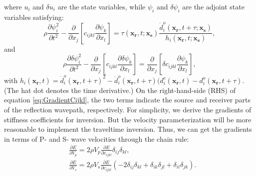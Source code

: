 where $u_i$ and $\delta u_i$ are the state variables, while $\psi_i$ and $\delta
\psi_i$ are the adjoint state variables satisfying:
\begin{equation}
    \rho \frac{\partial \psi^2_i}{\partial t^2}  -
    \frac{\partial}{\partial x_j}\left[ 
        c_{ijkl}\frac{\partial \psi_{k}}{\partial
		x_l}\right]=\tau(\mathbf{x_r},t;\mathbf{x_s})\frac{\dot{d}^o_i(\mathbf{x_r},t+\tau;\mathbf{x_s})}{h_i(\mathbf{x_r},t;\mathbf{x_s})},
    \label{eq:AdjointWE} 
\end{equation}
and
\begin{equation}
    \rho \frac{\partial \delta \psi^2_i}{\partial t^2}  -
    \frac{\partial}{\partial x_j}\left[ 
        c_{ijkl}\frac{\partial \delta \psi_{k}}{\partial
        x_l}\right]=\frac{\partial}{\partial x_j}\left[\delta c_{ijkl}\frac{\partial
		\psi_{k}}{\partial x_l}\right],
    \label{eq:AdjointDeltaWE} 
\end{equation}
with
$h_i(\mathbf{x_r},t)=\dot{d}^o_i(\mathbf{x_r},t+\tau)^2-\ddot{d}^o_i(\mathbf{x_r},t+\tau)(d^c_i(\mathbf{x_r},t)-d^o_i(\mathbf{x_r},t+\tau)$.
(The hat dot denotes the time derivative.) On the right-hand-side (RHS) of equation
\eqref{eq:GradientCijkl}, the two terms indicate the source and receiver
parts of the reflection wavepath, respectively. For simplicity, we derive the
gradients of stiffness
coefficients for inversion. But the velocity parameterization will be more reasonable
to implement the traveltime inversion.
Thus, we can get the gradients in terms of P- and S- wave velocities through the chain rule:
\begin{equation}
	\begin{split}
	&\frac{\partial E}{\partial V_p}=2\rho V_p\frac{\partial E}{\partial
		c_{ijkl}}\delta_{ij}\delta_{kl}, \\
	&\frac{\partial E}{\partial V_s}=2\rho V_s\frac{\partial
	E}{\partial c_{ijkl}}(-2\delta_{ij}\delta_{kl}+\delta_{ik}\delta_{jl}+
	\delta_{il}\delta_{jk}).
	\end{split}
    \label{eq:GradientVel}
\end{equation}

